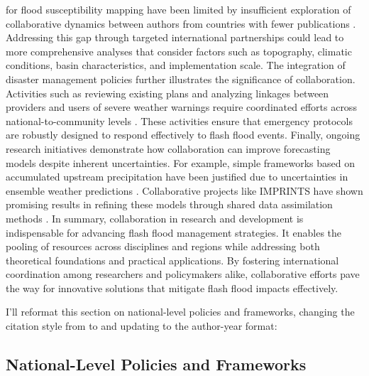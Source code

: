 for flood susceptibility mapping have been limited by insufficient exploration of collaborative dynamics between authors from countries with fewer publications \citep{Hinge2024}. Addressing this gap through targeted international partnerships could lead to more comprehensive analyses that consider factors such as topography, climatic conditions, basin characteristics, and implementation scale. The integration of disaster management policies further illustrates the significance of collaboration. Activities such as reviewing existing plans and analyzing linkages between providers and users of severe weather warnings require coordinated efforts across national-to-community levels \citep{Jubach2016}. These activities ensure that emergency protocols are robustly designed to respond effectively to flash flood events. Finally, ongoing research initiatives demonstrate how collaboration can improve forecasting models despite inherent uncertainties. For example, simple frameworks based on accumulated upstream precipitation have been justified due to uncertainties in ensemble weather predictions \citep{Alfieri2015}. Collaborative projects like IMPRINTS have shown promising results in refining these models through shared data assimilation methods \citep{Naulin2013}. In summary, collaboration in research and development is indispensable for advancing flash flood management strategies. It enables the pooling of resources across disciplines and regions while addressing both theoretical foundations and practical applications. By fostering international coordination among researchers and policymakers alike, collaborative efforts pave the way for innovative solutions that mitigate flash flood impacts effectively.

I'll reformat this section on national-level policies and frameworks, changing the citation style from \parencite{} to \citep{} and updating to the author-year format:
\subsection{National-Level Policies and Frameworks}
